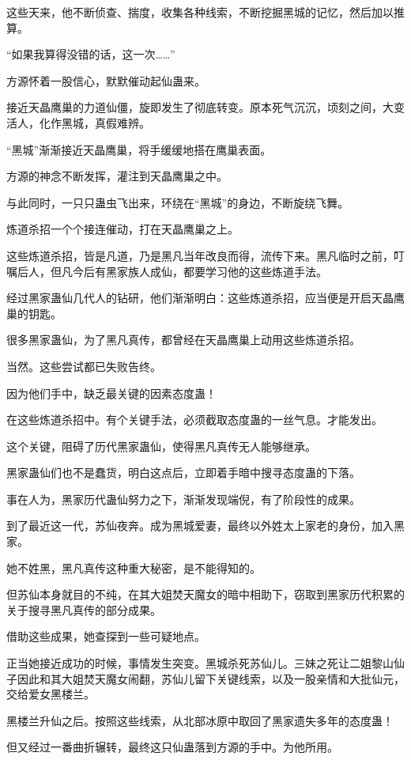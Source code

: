 \begin{this_body}
这些天来，他不断侦查、揣度，收集各种线索，不断挖掘黑城的记忆，然后加以推算。

“如果我算得没错的话，这一次……”

方源怀着一股信心，默默催动起仙蛊来。

接近天晶鹰巢的力道仙僵，旋即发生了彻底转变。原本死气沉沉，顷刻之间，大变活人，化作黑城，真假难辨。

“黑城”渐渐接近天晶鹰巢，将手缓缓地搭在鹰巢表面。

方源的神念不断发挥，灌注到天晶鹰巢之中。

与此同时，一只只蛊虫飞出来，环绕在“黑城”的身边，不断旋绕飞舞。

炼道杀招一个个接连催动，打在天晶鹰巢之上。

这些炼道杀招，皆是凡道，乃是黑凡当年改良而得，流传下来。黑凡临时之前，叮嘱后人，但凡今后有黑家族人成仙，都要学习他的这些炼道手法。

经过黑家蛊仙几代人的钻研，他们渐渐明白：这些炼道杀招，应当便是开启天晶鹰巢的钥匙。

很多黑家蛊仙，为了黑凡真传，都曾经在天晶鹰巢上动用这些炼道杀招。

当然。这些尝试都已失败告终。

因为他们手中，缺乏最关键的因素态度蛊！

在这些炼道杀招中。有个关键手法，必须截取态度蛊的一丝气息。才能发出。

这个关键，阻碍了历代黑家蛊仙，使得黑凡真传无人能够继承。

黑家蛊仙们也不是蠢货，明白这点后，立即着手暗中搜寻态度蛊的下落。

事在人为，黑家历代蛊仙努力之下，渐渐发现端倪，有了阶段性的成果。

到了最近这一代，苏仙夜奔。成为黑城爱妻，最终以外姓太上家老的身份，加入黑家。

她不姓黑，黑凡真传这种重大秘密，是不能得知的。

但苏仙本身就目的不纯，在其大姐焚天魔女的暗中相助下，窃取到黑家历代积累的关于搜寻黑凡真传的部分成果。

借助这些成果，她查探到一些可疑地点。

正当她接近成功的时候，事情发生突变。黑城杀死苏仙儿。三妹之死让二姐黎山仙子因此和其大姐焚天魔女闹翻，苏仙儿留下关键线索，以及一股亲情和大批仙元，交给爱女黑楼兰。

黑楼兰升仙之后。按照这些线索，从北部冰原中取回了黑家遗失多年的态度蛊！

但又经过一番曲折辗转，最终这只仙蛊落到方源的手中。为他所用。


\end{this_body}
